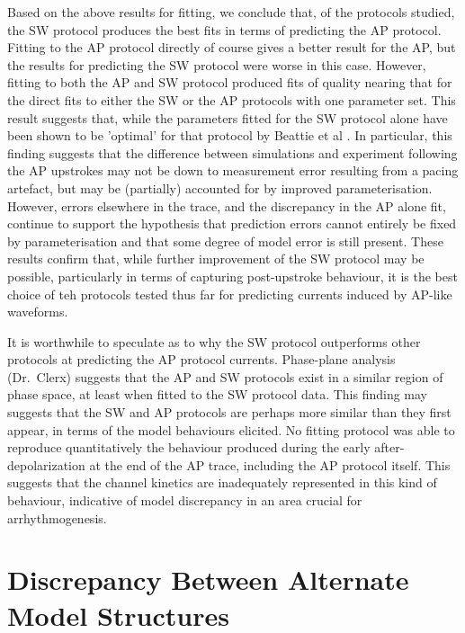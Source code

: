 \documentclass[11pt,a4paper,oneside]{article}
\begin{document}
Based on the above results for fitting, we conclude that, of the protocols studied, the SW protocol produces the best fits in terms of predicting the AP protocol. Fitting to the AP protocol directly of course gives a better result for the AP, but the results for predicting the SW protocol were worse in this case. However, fitting to both the AP and SW protocol produced fits of quality nearing that for the direct fits to either the SW or the  AP protocols with one parameter set. This result suggests that, while the parameters fitted for the SW protocol alone have been shown to be 'optimal' for that protocol by Beattie et al \cite{Beattie2018}. In particular, this finding suggests that the difference between simulations and experiment following the AP upstrokes may not be down to measurement error resulting from a pacing artefact, but may be (partially) accounted for by improved parameterisation. However, errors elsewhere in the trace, and the discrepancy in the AP alone fit, continue to support the hypothesis that prediction errors cannot entirely be fixed by parameterisation and that some degree of model error is still present. These results confirm that, while further improvement of the SW protocol may be possible, particularly in terms of capturing post-upstroke behaviour, it is the best choice of teh protocols tested thus far for predicting currents induced by AP-like waveforms.

It is worthwhile to speculate as to why the SW protocol outperforms other protocols at predicting the AP protocol currents. Phase-plane analysis (Dr.~Clerx) suggests that the AP and SW protocols exist in a similar region of phase space, at least when fitted to the SW protocol data. This finding may suggests that the SW and AP protocols are perhaps more similar than they first appear, in terms of the model behaviours elicited. No fitting protocol was able to reproduce quantitatively the behaviour produced during the early after-depolarization at the end of the AP trace, including the AP protocol itself. This suggests that the channel kinetics are inadequately represented in this kind of behaviour, indicative of model discrepancy in an area crucial for arrhythmogenesis.

\clearpage

\section{Discrepancy Between Alternate Model Structures}\label{Sec_ModelDiscrepancy}
\end{document}
